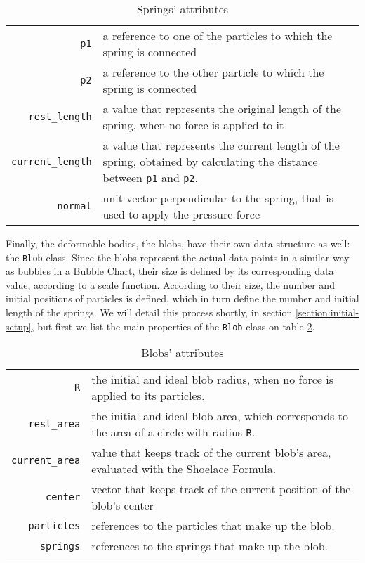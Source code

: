 \documentclass[manuscript, screen]{timtm}
\begin{document}
\begin{table}
  \caption{Springs' attributes}
  \label{tab:spring}
  \begin{tabularx}{\textwidth}{rX}
    \toprule
    \texttt{p1} & a reference to one of the particles to which the spring is connected\\
    \texttt{p2} & a reference to the other particle to which the spring is connected\\
    \texttt{rest\_length} & a value that represents the original length of the spring, when no force is applied to it\\
    \texttt{current\_length} & a value that represents the current length of the spring, obtained by calculating the distance between \texttt{p1} and \texttt{p2}.\\
    \texttt{normal} & unit vector perpendicular to the spring, that is used to apply the pressure force\\
    \bottomrule
    \end{tabularx}
\end{table}

Finally, the deformable bodies, the blobs, have their own data structure as well: the \texttt{Blob} class. Since the blobs represent the actual data points in a similar way as bubbles in a Bubble Chart, their size is defined by its corresponding data value, according to a scale function. According to their size, the number and initial positions of particles is defined, which in turn define the number and initial length of the springs. We will detail this process shortly, in section \ref{section:initial-setup}, but first we list the main properties of the \texttt{Blob} class on table \ref{tab:blob}.

\begin{table}
  \caption{Blobs' attributes}
  \label{tab:blob}
  \begin{tabularx}{\textwidth}{rX}
    \toprule
    \texttt{R} & the initial and ideal blob radius, when no force is applied to its particles.\\
    \texttt{rest\_area} & the initial and ideal blob area, which corresponds to the area of a circle with radius \texttt{R}.\\
    \texttt{current\_area} & value that keeps track of the current blob's area, evaluated with the Shoelace Formula.\\
    \texttt{center} & vector that keeps track of the current position of the blob's center\\
    \texttt{particles} & references to the particles that make up the blob.\\
    \texttt{springs} & references to the springs that make up the blob.\\
    \bottomrule
    \end{tabularx}
\end{table}
\end{document}
